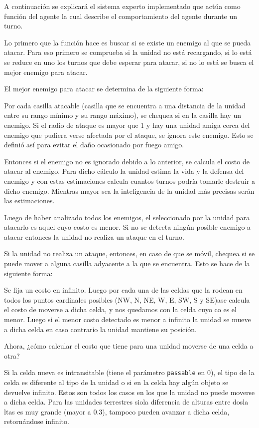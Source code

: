 A continuación se explicará el sistema experto implementado que actúa como función del agente la cual describe el comportamiento del agente durante un turno.

Lo primero que la función hace es buscar si se existe un enemigo al que se pueda atacar. Para eso primero se comprueba si la unidad no está recargando, si lo está se reduce en uno los turnos que debe esperar para atacar, si no lo está se busca el mejor enemigo para atacar. 
 
El mejor enemigo para atacar se determina de la siguiente forma:
 
Por cada casilla atacable (casilla que se encuentra a una distancia de la unidad entre su rango mínimo y su rango máximo), se chequea si en la casilla hay un enemigo. Si el radio de ataque es mayor que 1 y hay una unidad amiga cerca del enemigo que pudiera verse afectada por el ataque, se ignora este enemigo. Esto se definió así para evitar el daño ocasionado por fuego amigo.
 
Entonces si el enemigo no es ignorado debido a lo anterior, se calcula el costo de atacar al enemigo. Para dicho cálculo la unidad estima la vida y la defensa del enemigo y con estas estimaciones calcula cuantos turnos podría tomarle destruir a dicho enemigo. Mientras mayor sea la inteligencia de la unidad más precisas serán las estimaciones.

Luego de haber analizado todos los enemigos, el seleccionado por la unidad para atacarlo es aquel cuyo costo es menor. Si no se detecta ningún posible enemigo a atacar entonces la unidad no realiza un ataque en el turno.
 
Si la unidad no realiza un ataque, entonces, en caso de que se móvil, chequea si se puede mover a alguna casilla adyacente a la que se encuentra. Esto se hace de la siguiente forma:
 
Se fija un costo en infinito. Luego por cada una de las celdas que la rodean en todos los puntos cardinales posibles (NW, N, NE, W, E, SW, S y SE)ase calcula el costo de moverse a dicha celda, y nos quedamos con la celda cuyo co es el menor. Luego si el menor costo detectado es menor a infinito la unidad se mueve a dicha celda en caso contrario la unidad mantiene su posición. 
 
Ahora, ¿cómo calcular el costo que tiene para una unidad moverse de una celda a otra?
 
Si la celda nueva es intransitable (tiene el parámetro \verb|passable| en 0), el tipo de la celda es diferente al tipo de la unidad o si en la celda hay algún objeto se devuelve infinito. Estos son todos los casos en los que la unidad no puede moverse a dicha celda. Para las unidades terrestres siola diferencia de alturas entre dosla ltas es muy grande (mayor a 0.3), tampoco pueden avanzar a dicha celda, retornándose infinito. 
 
